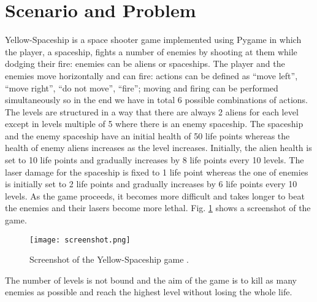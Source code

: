 \section{Scenario and Problem}
Yellow-Spaceship \cite{Yellow-Spaceship} is a space shooter game implemented using Pygame \cite{PyGame} in which the
player, a spaceship, fights a number of enemies by shooting at them while dodging their fire:
enemies can be aliens or spaceships. The player and the enemies move horizontally and
can fire: actions can be defined as “move left”, “move right”, “do not move”, “fire”; moving
and firing can be performed simultaneously so in the end we have in total 6 possible
combinations of actions. The levels are structured in a way that there are always 2 aliens for
each level except in levels multiple of 5 where there is an enemy spaceship. The spaceship
and the enemy spaceship have an initial health of 50 life points whereas the health of enemy
aliens increases as the level increases. Initially, the alien health is set to 10 life points and
gradually increases by 8 life points every 10 levels. The laser damage for the spaceship is
fixed to 1 life point whereas the one of enemies is initially set to 2 life points and gradually
increases by 6 life points every 10 levels. As the game proceeds, it becomes more difficult
and takes longer to beat the enemies and their lasers become more lethal. Fig. \ref{fig:game_screenshot} shows a
screenshot of the game.

\begin{figure}[ht]
\centerline{\texttt{[image: screenshot.png]}}
\caption{Screenshot of the Yellow-Spaceship game \cite{Yellow-Spaceship}.}
\label{fig:game_screenshot}
\end{figure}

The number of levels is not bound and the aim of the game is to kill as many enemies as
possible and reach the highest level without losing the whole life.
